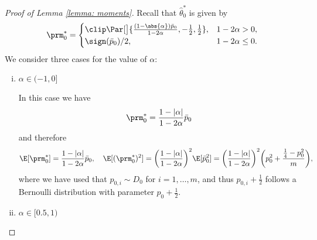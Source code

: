 \begin{proof}[Proof of Lemma \ref{lemma: moments}]
    Recall that $\hat{\theta}_0^\ast$ is given by
    \[
        \prm^*_0 =
        \begin{cases}
            \clip\Par[\big]{\frac{(1 - \abs{\alpha}) \bar{p}_0}{1 - 2
            \alpha},
            -\frac{1}{2}, \frac{1}{2}}, & 1 - 2 \alpha > 0,\\
            \sign(\bar{p}_0) / 2, & 1 - 2 \alpha \le 0.
        \end{cases}
    \]
    We consider three cases for the value of $\alpha$: 
    \begin{enumerate}[(i)]
        \item $\alpha \in (-1, 0]$

            In this case we have 
            \begin{equation*}
                \prm^\ast_0 = \frac{1 - |\alpha|}{1-2\alpha} \bar{p}_0
            \end{equation*}
            and therefore 
            \begin{equation*}
                \E[\prm^\ast_0] = \frac{1 - |\alpha|}{1-2\alpha}
                \bar{p}_0, \quad \E[(\prm^\ast_0)^2] = \bigg( \frac{1 -
                |\alpha|}{1-2\alpha}\bigg)^2\E[\bar{p}_0^2] = \bigg(
                \frac{1 - |\alpha|}{1-2\alpha}\bigg)^2\bigg( p_0^2 +
                \frac{\frac14 - p_0^2}{m}\bigg),
            \end{equation*}
            where we have used that $p_{0, i} \sim D_0$ for $i=1, \dots, m$,
            and thus $p_{0,i} + \frac12$ follows a Bernoulli distribution with
            parameter $p_0 + \frac12$.

        \item $\alpha \in [0.5, 1)$


\end{enumerate}
\end{proof}
